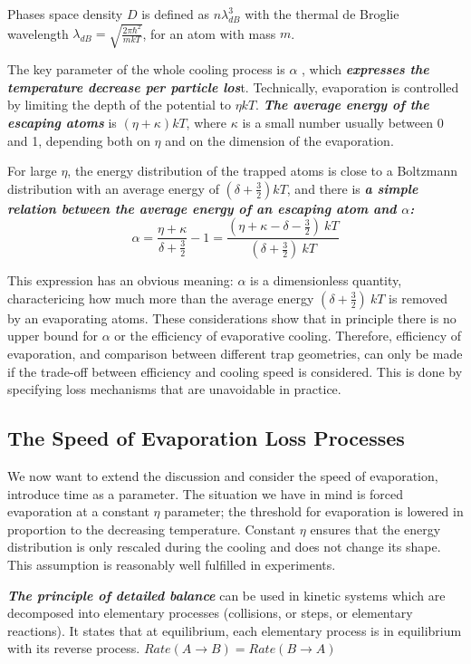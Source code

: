 \documentclass[12]{article}
\begin{document}
Phases space density $D$ is defined as $n\lambda^3_{dB}$ with the thermal de Broglie wavelength $\lambda_{dB} = \sqrt{\frac{2\pi \hbar^2}{mkT}}$, for an atom with mass $m$. 

The key parameter of the whole cooling process is $\alpha$ , which \textbf{\textit{expresses the temperature decrease per particle los}}t. Technically, evaporation is controlled by limiting the depth of the potential to $\eta kT$. \textbf{\textit{The average energy of the escaping atoms}} is $(\eta + \kappa)kT$, where $\kappa$ is a small number usually between 0 and 1, depending both on $\eta$ and on the dimension of the evaporation.  

For large $\eta$, the energy distribution of the trapped atoms is close to a Boltzmann distribution with an average energy of $(\delta+\frac{3}{2})kT$, and there is \textbf{\textit{a simple relation between the average energy of an escaping atom and $\alpha$:}} $$\alpha= \frac{\eta+\kappa}{\delta+\frac{3}{2}}-1 =\frac{(\eta+\kappa-\delta-\frac{3}{2})\ kT}{(\delta+\frac{3}{2})\ kT}$$

This expression has an obvious meaning: $\alpha$ is a dimensionless quantity, charactericing how much more than the average energy $(\delta+\frac{3}{2})\ kT$ is removed by an evaporating atoms. These considerations show that in principle there is no upper bound for $\alpha$ or the efficiency of evaporative cooling. Therefore, efficiency of evaporation, and comparison between different trap geometries, can only be made if the trade-off between efficiency and cooling speed is considered. This is done by specifying loss mechanisms that are unavoidable in practice.
\subsection{The Speed of Evaporation Loss Processes}
We now want to extend the discussion and consider the speed of evaporation, introduce time as a parameter. The situation we have in mind is forced evaporation at a constant $\eta$ parameter; the threshold for evaporation is lowered in proportion to the decreasing temperature. Constant $\eta$ ensures that the energy distribution is only rescaled during the cooling and does not change its shape. This assumption is reasonably well fulfilled in experiments.

\textbf{\textit{The principle of detailed balance}} can be used in kinetic systems which are decomposed into elementary processes (collisions, or steps, or elementary reactions). It states that at equilibrium, each elementary process is in equilibrium with its reverse process. $Rate(A\rightarrow B)=Rate(B\rightarrow A)$
\end{document}

